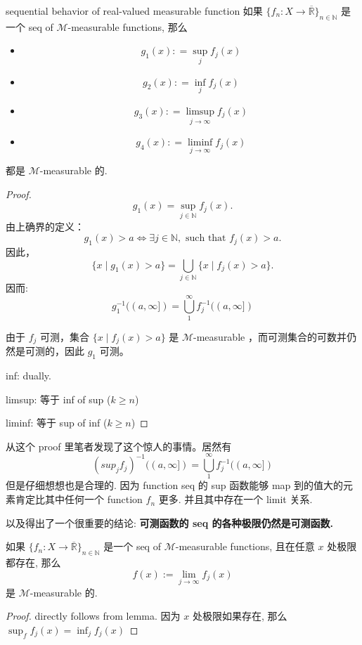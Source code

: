 \documentclass[lang=cn,11pt]{elegantbook}
\begin{document}
\begin{lemma}{sequential behavior of real-valued measurable function}
如果 $\{ f_n :X\rightarrow   \overline{\mathbb{R}}\}_{n\in\mathbb{N}}$ 是一个 seq of $\mathcal{M}$-measurable functions, 那么
\begin{itemize}
    \item $$g_1(x) : = \sup_j f_j(x)$$
    \item $$g_2(x) : = \inf_j f_j(x)$$
    \item $$g_3(x) : = \limsup_{j \rightarrow \infty} f_j(x)$$
    \item $$g_4(x) : = \liminf_{j \rightarrow \infty} f_j(x)$$
\end{itemize}
都是 $\mathcal{M}$-measurable 的.
\end{lemma}
\begin{proof}
 \[
g_1(x) = \sup_{j \in \mathbb{N}} f_j(x).
\]
由上确界的定义：
\[
g_1(x) > a \iff \exists j \in \mathbb{N}, \text{ such that } f_j(x) > a.
\]
因此，
\[
\{ x \mid g_1(x) > a \} = \bigcup_{j \in \mathbb{N}} \{ x \mid f_j(x) > a \}.
\]
因而:
$$
g_1 ^{-1}((a,\infty]) = \bigcup_1^\infty f_j ^{-1} ((a,\infty])
$$

由于 \( f_j \) 可测，集合 \( \{ x \mid f_j(x) > a \} \) 是 \(\mathcal{M}\)-measurable ，而可测集合的可数并仍然是可测的，因此 \( g_1 \) 可测。

inf: dually.

limsup: 等于 inf of sup ($k\geq n$)

liminf: 等于 sup of inf  ($k\geq n$)
\end{proof}
\begin{remark}
    从这个 proof 里笔者发现了这个惊人的事情。居然有
  $$
(sup_{j} f_j) ^{-1}((a,\infty]) = \bigcup_1^\infty f_j ^{-1} ((a,\infty])
$$
但是仔细想想也是合理的. 因为 function seq 的 sup 函数能够 map 到的值大的元素肯定比其中任何一个 function $f_n$ 更多. 并且其中存在一个 limit 关系.

以及得出了一个很重要的结论: \textbf{可测函数的 seq 的各种极限仍然是可测函数.}
\end{remark}


\begin{corollary}
    如果 $\{ f_n :X\rightarrow   \overline{\mathbb{R}}\}_{n\in\mathbb{N}}$ 是一个 seq of $\mathcal{M}$-measurable functions, 且在任意 $x$ 处极限都存在, 那么
$$
f(x) := \lim_{j\rightarrow \infty} f_j(x)
$$
是 $\mathcal{M}$-measurable 的.
\end{corollary}
\begin{proof}
    directly follows from lemma. 因为 $x$ 处极限如果存在, 那么 $\sup_f f_j (x)  = \inf_j f_j(x) $
\end{proof}
\end{document}
